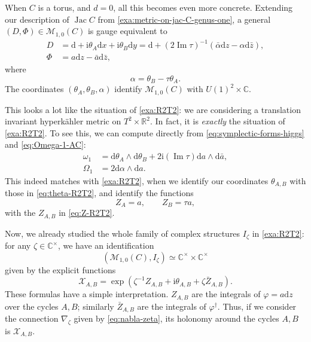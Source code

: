 \documentclass[12pt,letterpaper,reqno]{article}
\numberwithin{equation}{section}
\newcommand{\cM}{\ensuremath{\mathcal M}}
\newcommand{\cX}{\ensuremath{\mathcal X}}
\newcommand{\R}{\ensuremath{\mathbb R}}
\newcommand{\C}{\ensuremath{\mathbb C}}
\newcommand{\hk}{hyperk\"ahler\xspace}
\newcommand{\I}{{\mathrm i}}
\newcommand{\de}{\mathrm{d}}
\newcommand{\ti}[1]{\textit{#1}}
\DeclareMathOperator{\im}{Im}
\DeclareMathOperator{\Jac}{Jac}
\begin{document}
\begin{example}
When $C$ is a torus, and $d = 0$, all this becomes even 
more concrete. Extending our description of $\Jac C$
from \autoref{exa:metric-on-jac-C-genus-one}, a general $(D,\Phi) \in \cM_{1,0}(C)$ is gauge equivalent to
\begin{align}
  D &= \de + \I \theta_A \de x + \I \theta_B \de y = \de + (2 \im \tau)^{-1} (\bar\alpha \de z - \alpha \de \bar{z}), \\
  \Phi &= a \de z - \bar{a} \de \bar{z},
\end{align}
where
\begin{equation}
  \alpha = \theta_B - \tau \theta_A.
\end{equation}
The coordinates $(\theta_A, \theta_B, \alpha)$ identify $\cM_{1,0}(C)$
with $U(1)^2 \times \C$.

This looks a lot like the situation of \autoref{exa:R2T2}: we are
considering a translation invariant \hk metric on $T^2 \times \R^2$. 
In fact, it is \ti{exactly} the situation of \autoref{exa:R2T2}.
To see this, we can compute directly from \eqref{eq:symplectic-forms-higgs} and
\eqref{eq:Omega-1-AC}:
\begin{align}
  \omega_1 &= \de \theta_A \wedge \de \theta_B + 2 \I (\im \tau) \de a \wedge \de \bar{a}, \label{eq:symplectic-higgs-torus} \\
  \Omega_1 &= 2 \de \alpha \wedge \de a. \label{eq:holsymp-higgs-torus}
\end{align}
This indeed matches with \autoref{exa:R2T2}, when we identify
our coordinates $\theta_{A,B}$ with those in \eqref{eq:theta-R2T2},
and identify the functions
\begin{equation}
  Z_A = a, \qquad Z_B = \tau a,
\end{equation}
with the $Z_{A,B}$ in \eqref{eq:Z-R2T2}.

Now, we already studied the whole family of complex
structures $I_\zeta$ in \autoref{exa:R2T2}: for any
$\zeta \in \C^\times$, we have an identification 
\begin{equation}
  (\cM_{1,0}(C), I_\zeta) \simeq \C^\times \times \C^\times
\end{equation}
given by the explicit functions
\begin{equation}
  \cX_{A,B} = \exp \left( \zeta^{-1} Z_{A,B} + \I \theta_{A,B} + \zeta \bar{Z}_{A,B} \right).
\end{equation}
These formulas have a simple interpretation.
$Z_{A,B}$ are the integrals of $\varphi = a \de z$
over the cycles $A,B$; similarly $\bar Z_{A,B}$ are
the integrals of $\varphi^\dagger$.
Thus, if we consider the connection $\nabla_\zeta$ given by 
\eqref{eq:nabla-zeta}, its holonomy around the cycles 
$A,B$ is $\cX_{A,B}$.

\end{example}
\end{document}
